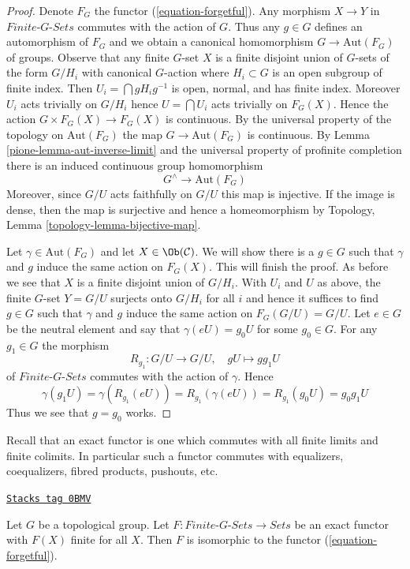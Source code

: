 \begin{proof}

Denote $F_G$ the functor (\ref{equation-forgetful}). Any morphism
$X \to Y$ in $\textit{Finite-}G\textit{-Sets}$ commutes with the action
of $G$. Thus any $g \in G$ defines an automorphism of $F_G$ and
we obtain a canonical homomorphism $G \to \text{Aut}(F_G)$ of groups.
Observe that any finite $G$-set $X$ is a finite disjoint union of
$G$-sets of the form $G/H_i$ with canonical $G$-action where
$H_i \subset G$ is an open subgroup of finite index. Then
$U_i = \bigcap gH_ig^{-1}$ is open, normal, and has finite index.
Moreover $U_i$ acts trivially on $G/H_i$ hence
$U = \bigcap U_i$ acts trivially on $F_G(X)$. Hence the action
$G \times F_G(X) \to F_G(X)$ is continuous. By the universal
property of the topology on $\text{Aut}(F_G)$ the map
$G \to \text{Aut}(F_G)$ is continuous.
By Lemma \ref{pione-lemma-aut-inverse-limit} and the universal property
of profinite completion there is an induced
continuous group homomorphism
$$
G^\wedge \longrightarrow \text{Aut}(F_G)
$$
Moreover, since $G/U$ acts faithfully on $G/U$ this map is
injective. If the image is dense, then the map is surjective and hence a
homeomorphism by Topology, Lemma \ref{topology-lemma-bijective-map}.

\medskip\noindent
Let $\gamma \in \text{Aut}(F_G)$ and let $X \in \Ob(\mathcal{C})$.
We will show there is a $g \in G$ such that $\gamma$ and $g$
induce the same action on $F_G(X)$. This will finish the proof.
As before we see that $X$ is a finite disjoint union of $G/H_i$.
With $U_i$ and $U$ as above, the finite $G$-set $Y = G/U$
surjects onto $G/H_i$ for all $i$ and hence it suffices to
find $g \in G$ such that $\gamma$ and $g$ induce the same action
on $F_G(G/U) = G/U$. Let $e \in G$ be the neutral element and
say that $\gamma(eU) = g_0U$ for some $g_0 \in G$. For any
$g_1 \in G$ the morphism
$$
R_{g_1} : G/U \longrightarrow G/U,\quad gU \longmapsto gg_1U
$$
of $\textit{Finite-}G\textit{-Sets}$ commutes with the action of
$\gamma$. Hence
$$
\gamma(g_1U) = \gamma(R_{g_1}(eU)) = R_{g_1}(\gamma(eU)) =
R_{g_1}(g_0U) = g_0g_1U
$$
Thus we see that $g = g_0$ works.
\end{proof}

Recall that an exact functor is one which commutes with all
finite limits and finite colimits. In particular such a functor
commutes with equalizers, coequalizers, fibred products,
pushouts, etc.

\begin{lemma}
\label{pione-lemma-second-fundamental-functor}
\href{https://stacks.math.columbia.edu/tag/0BMV}{\texttt{Stacks tag 0BMV}}

Let $G$ be a topological group. Let
$F : \textit{Finite-}G\textit{-Sets} \to \textit{Sets}$
be an exact functor with $F(X)$ finite for all $X$.
Then $F$ is isomorphic to the functor (\ref{equation-forgetful}).
\end{lemma}

